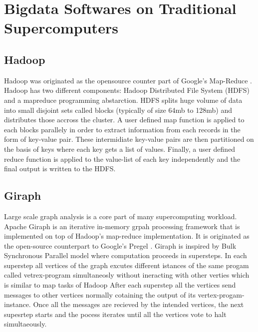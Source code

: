 \documentclass[conference]{IEEEtran}
\begin{document}


\section {Bigdata Softwares on Traditional Supercomputers} \label{Bigdata Softwares on Traditional Supercomputers}
\subsection {Hadoop}
Hadoop was originated as the opensource counter part of Google's Map-Reduce \cite{fw:mapreduce}.
Hadoop has two different components: Hadoop Distributed File System (HDFS) and a mapreduce programming abstarction.
HDFS splits huge volume of data into small disjoint sets called blocks (typically of size 64mb to 128mb) and distributes those accross the cluster.
A user defined map function is applied to each blocks parallely in order to extract information from each records in the form of key-value pair.
These intermidiate key-value pairs are then partitioned on the basis of keys where each key gets a list of values.
Finally, a user defined reduce function is applied to the value-list of each key independently and the final output is written to the HDFS.
 
\subsection {Giraph}
Large scale graph analysis is a core part of many supercomputing workload.
Apache Giraph is an iterative in-memory grpah processing framework that is implemented on top of Hadoop's map-reduce implementation.
It is originated as the open-source counterpart to Google's Pregel \cite{fw:pregel}.
Giraph is inspired by Bulk Synchronous Parallel model \cite{fw:bsp} where computation proceeds in supersteps.
In each superstep all vertices of the graph excutes different istances of the same progam called vetrex-program simultaneosly without ineracting with other verties which is similar to map tasks of Hadoop
After each superstep all the vertices send messages to other vertices normally cotaining the output of its vertex-progam-instance.
Once all the messages are recieved by the intended vertices, the next supesrtep starts and the pocess iterates until all the vertices vote to halt simultaeously.
\end{document}
